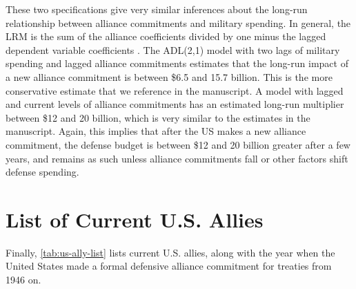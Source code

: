 \documentclass[12pt]{article}
\begin{document}
These two specifications give very similar inferences about the long-run relationship between alliance commitments and military spending. 
In general, the LRM is the sum of the alliance coefficients divided by one minus the lagged dependent variable coefficients \citep{CookWebb2021}.
The ADL(2,1) model with two lags of military spending and lagged alliance commitments estimates that the long-run impact of a new alliance commitment is between \$6.5 and 15.7 billion. 
This is the more conservative estimate that we reference in the manuscript. 
A model with lagged and current levels of alliance commitments has an estimated long-run multiplier between \$12 and 20 billion, which is very similar to the estimates in the manuscript. 
Again, this implies that after the US makes a new alliance commitment, the defense budget is between \$12 and 20 billion greater after a few years, and remains as such unless alliance commitments fall or other factors shift defense spending.


\section{List of Current U.S. Allies}

Finally, \autoref{tab:us-ally-list} lists current U.S. allies, along with the year when the United States made a formal defensive alliance commitment for treaties from 1946 on.
\end{document}

